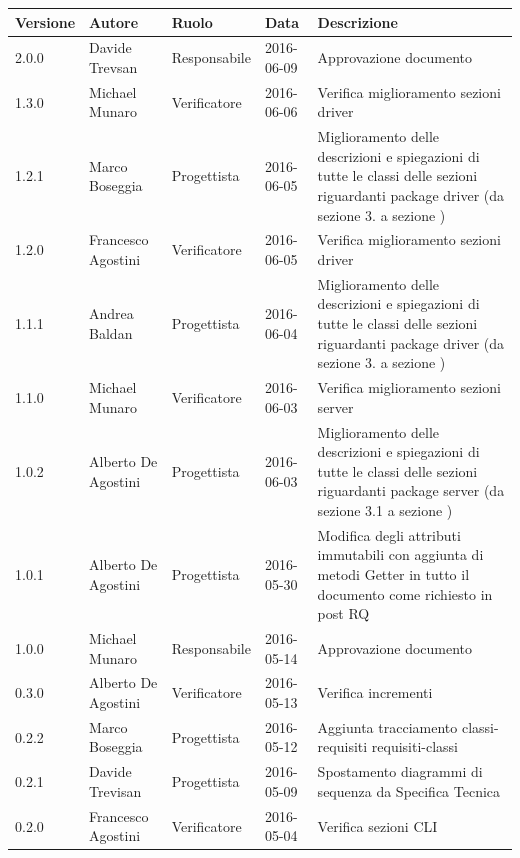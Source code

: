 \documentclass{scalatekids-article}
\begin{document}
\begin{center}
  \begin{longtable}{| l | l | l | l | p{5cm} |}
    \hline
    Versione & Autore & Ruolo & Data & Descrizione \\
    \hline
    2.0.0 & Davide Trevsan & Responsabile & 2016-06-09 & Approvazione documento\\
    \hline
    1.3.0 & Michael Munaro & Verificatore & 2016-06-06 & Verifica miglioramento sezioni driver\\
    \hline
    1.2.1 & Marco Boseggia & Progettista & 2016-06-05 & Miglioramento delle descrizioni e spiegazioni di tutte le classi delle sezioni riguardanti package driver (da sezione 3. a sezione )\\%
    \hline
    1.2.0 & Francesco Agostini & Verificatore & 2016-06-05 & Verifica miglioramento sezioni driver\\
    \hline
    1.1.1 & Andrea Baldan & Progettista & 2016-06-04 & Miglioramento delle descrizioni e spiegazioni di tutte le classi delle sezioni riguardanti package driver (da sezione 3. a sezione )\\%
    \hline
    1.1.0 & Michael Munaro & Verificatore & 2016-06-03 & Verifica miglioramento sezioni server\\
    \hline
    1.0.2 & Alberto De Agostini & Progettista & 2016-06-03 & Miglioramento delle descrizioni e spiegazioni di tutte le classi delle sezioni riguardanti package server (da sezione 3.1 a sezione )\\%
    \hline
    1.0.1 & Alberto De Agostini & Progettista & 2016-05-30 & Modifica degli attributi immutabili con aggiunta di metodi Getter in tutto il documento come richiesto in post RQ\\
    \hline
    1.0.0 & Michael Munaro & Responsabile & 2016-05-14 & Approvazione documento\\
    \hline
    0.3.0 & Alberto De Agostini & Verificatore & 2016-05-13 & Verifica incrementi\\
    \hline
    0.2.2 & Marco Boseggia & Progettista & 2016-05-12 & Aggiunta tracciamento classi-requisiti requisiti-classi\\
    \hline
    0.2.1 & Davide Trevisan & Progettista & 2016-05-09 & Spostamento diagrammi di sequenza da Specifica Tecnica\\
    \hline
    0.2.0 & Francesco Agostini & Verificatore & 2016-05-04 & Verifica sezioni CLI\\

\end{longtable}
\end{center}
\end{document}
